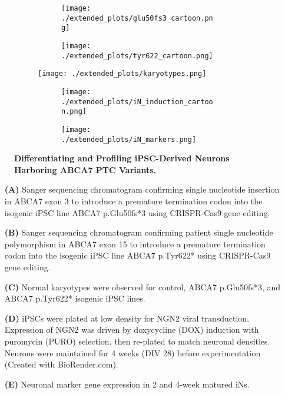 \begin{figure}[H]
    \begin{subfigure}[t]{0.3\textwidth}
        \begin{subfigure}[t]{\textwidth}
            \caption{}
            \texttt{[image: ./extended\_plots/glu50fs3\_cartoon.png]}        
        \end{subfigure}    
        \begin{subfigure}[t]{\textwidth}
            \caption{}
            \texttt{[image: ./extended\_plots/tyr622\_cartoon.png]}        
        \end{subfigure}  
    \end{subfigure}  
    \begin{subfigure}[t]{0.2\textwidth}
        \caption{}
        \texttt{[image: ./extended\_plots/karyotypes.png]}        
    \end{subfigure}  
    \begin{subfigure}[t]{0.4\textwidth}
        \begin{subfigure}[t]{\textwidth}
            \caption{}
            \texttt{[image: ./extended\_plots/iN\_induction\_cartoon.png]}        
        \end{subfigure}    
        \begin{subfigure}[t]{\textwidth}
            \caption{}
            \texttt{[image: ./extended\_plots/iN\_markers.png]}        
        \end{subfigure}  
    \end{subfigure}    
    \caption{
        \textbf{Differentiating and Profiling iPSC-Derived Neurons Harboring ABCA7 PTC Variants.}\\
    }
    \label{fig:differentiating_iPSC_neurons}
\end{figure}
\begin{itemize}
    \item[\textbf{(A)}] Sanger sequencing chromatogram confirming single nucleotide insertion in ABCA7 exon 3 to introduce a premature termination codon into the isogenic iPSC line ABCA7 p.Glu50fs*3 using CRISPR-Cas9 gene editing. 
    \item[\textbf{(B)}] Sanger sequencing chromatogram confirming patient single nucleotide polymorphism in ABCA7 exon 15 to introduce a premature termination codon into the isogenic iPSC line ABCA7 p.Tyr622* using CRISPR-Cas9 gene editing. 
    \item[\textbf{(C)}] Normal karyotypes were observed for control, ABCA7 p.Glu50fs*3, and ABCA7 p.Tyr622* isogenic iPSC lines. 
    \item[\textbf{(D)}] iPSCs were plated at low density for NGN2 viral transduction. Expression of NGN2 was driven by doxycycline (DOX) induction with puromycin (PURO) selection, then re-plated to match neuronal densities. Neurons were maintained for 4 weeks (DIV 28) before experimentation (Created with BioRender.com). 
    \item[\textbf{(E)}] Neuronal marker gene expression in 2 and 4-week matured iNs. 
\end{itemize}